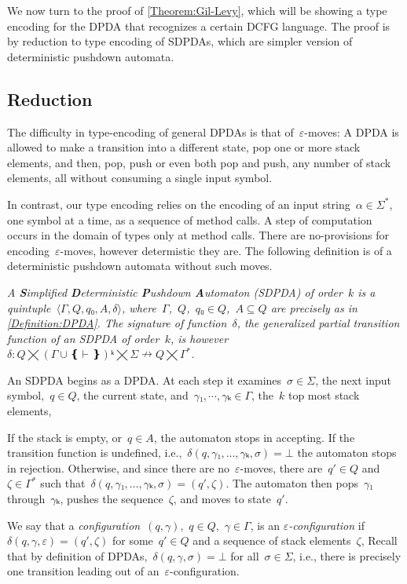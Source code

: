We now turn to the proof of \cref{Theorem:Gil-Levy}, which will be showing a type encoding for the DPDA that recognizes a certain DCFG language.
The proof is by reduction to type encoding of SDPDAs, which are simpler version of deterministic pushdown automata.

\subsection{Reduction}
The difficulty in type-encoding of general DPDAs is that of~$ε$-moves:
A DPDA is allowed to make a transition into a different state,
  pop one or more stack elements, and then, pop, push or even both pop and push, any number of stack elements,
  all without consuming a single input symbol.

In contrast, our type encoding relies on the encoding of an input string~$α∈Σ^*$, one symbol at a time, as a sequence of method calls.
A step of computation occurs in the domain of \Java types only at method calls. There are no-provisions for encoding~$ε$-moves, however determistic
  they are.
The following definition is of a deterministic pushdown automata without such moves.

\begin{Definition}
  \label{Definition:SDPDA}
  \slshape
  A \emph{\textbf Simplified \textbf Deterministic \textbf Pushdown \textbf Automaton} (SDPDA) of order~$k$ is
    a quintuple~$⟨Γ,Q,q₀,A,δ⟩$,
  where~$Γ$,~$Q$,~$q₀∈Q$,~$A⊆Q$ are precisely as in \cref{Definition:DPDA}.
  The signature of function~$δ$, the \emph{generalized partial transition function}
  of an SDPDA of order~$k$, is however~$δ: Q⨉\left(Γ∪❴\vdash❵\right)ᵏ⨉Σ↛Q⨉Γ^*$.
  \par
  An SDPDA begins as a DPDA. At each step it examines~$σ∈Σ$,
    the next input symbol,~$q∈Q$, the current state,
    and~$γ₁,⋯,γₖ∈Γ$, the~$k$ top most stack elements,
  \par
  If the stack is empty, or~$q∈A$, the automaton stops in accepting.
  If the transition function is undefined, i.e.,~$δ(q,γ₁,…,γₖ,σ)=⊥$ the automaton
    stops in rejection.
  Otherwise, and since there are no~$ε$-moves, there are~$q'∈Q$ and~$ζ∈Γ^*$
    such that~$δ(q,γ₁,…,γₖ,σ)=(q',ζ)$.
  The automaton then pops~$γ₁$ through~$γₖ$, pushes the sequence~$ζ$, and
    moves to state~$q'$.
\end{Definition}

We say that
a \emph{configuration}~$(q,γ)$,~$q∈Q$,~$γ∈Γ$,
  is an \emph{$ε$-configuration} if~$δ(q,γ,ε)=(q',ζ)$ for
    some~$q'∈Q$ and a sequence of stack elements~$ζ$,
Recall that by definition of DPDAs,~$δ(q,γ,σ)=⊥$ for
  all~$σ∈Σ$, i.e., there is precisely one transition
  leading out of an~$ε$-configuration.

